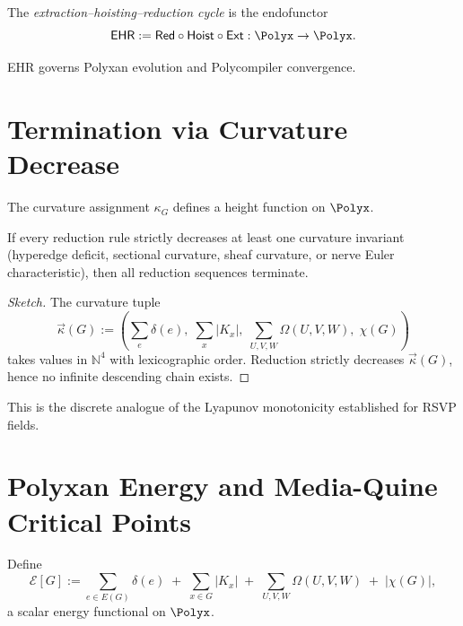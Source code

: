\begin{definition}
The \emph{extraction–hoisting–reduction cycle} is the endofunctor
\[
\mathsf{EHR} := \mathsf{Red} \circ \mathsf{Hoist} \circ \mathsf{Ext}
: \Polyx \to \Polyx.
\]
\end{definition}

EHR governs Polyxan evolution and Polycompiler convergence.

\section{Termination via Curvature Decrease}

The curvature assignment $\kappa_G$ defines a height function on $\Polyx$.

\begin{theorem}
If every reduction rule strictly decreases at least one curvature invariant
(hyperedge deficit, sectional curvature, sheaf curvature, or nerve Euler
characteristic), then all reduction sequences terminate.
\end{theorem}

\begin{proof}[Sketch]
The curvature tuple
\[
\vec{\kappa}(G) := (\sum_e \delta(e),\; \sum_x |K_x|,\; \sum_{U,V,W} \Omega(U,V,W),\; \chi(G))
\]
takes values in $\mathbb{N}^4$ with lexicographic order.  
Reduction strictly decreases $\vec{\kappa}(G)$, hence no infinite descending
chain exists.
\end{proof}

This is the discrete analogue of the Lyapunov monotonicity established for
RSVP fields.

\section{Polyxan Energy and Media-Quine Critical Points}

\begin{definition}
Define
\[
\mathcal{E}[G] :=
\sum_{e\in E(G)} \delta(e)
\;+\;
\sum_{x\in G} |K_x|
\;+\;
\sum_{U,V,W} \Omega(U,V,W)
\;+\;
|\chi(G)|,
\]
a scalar energy functional on $\Polyx$.
\end{definition}


